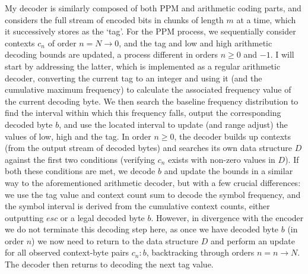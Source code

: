 \documentclass[a4paper, 11pt]{article}
\begin{document}
My decoder is similarly composed of both PPM and arithmetic coding parts, and considers the full stream of encoded bits in chunks of length $m$ at a time, which it successively stores as the `tag'. For the PPM process, we sequentially consider contexts $c_{n}$ of order $n = N \to 0$, and the tag and low and high arithmetic decoding bounds are updated, a process different in orders $n \geq 0$ and $-1$. I will start by addressing the latter, which is implemented as a regular arithmetic decoder, converting the current tag to an integer and using it (and the cumulative maximum frequency) to calculate the associated frequency value of the current decoding byte. We then search the baseline frequency distribution to find the interval within which this frequency falls, output the corresponding decoded byte $b$, and use the located interval to update (and range adjust) the values of low, high and the tag. In order $n \geq 0$, the decoder builds up contexts (from the output stream of decoded bytes) and searches its own data structure $D$ against the first two conditions (verifying $c_{n}$ exists with non-zero values in $D$). If both these conditions are met, we decode $b$ and update the bounds in a similar way to the aforementioned arithmetic decoder, but with a few crucial differences: we use the tag value and context count sum to decode the symbol frequency, and the symbol interval is derived from the cumulative context counts, either outputting $esc$ or a legal decoded byte $b$. However, in divergence with the encoder we do not terminate this decoding step here, as once we have decoded byte $b$ (in order $n$) we now need to return to the data structure $D$ and perform an update for all observed context-byte pairs $c_{n} \colon b$, backtracking through orders $n = n \to N$. The decoder then returns to decoding the next tag value.
\end{document}

